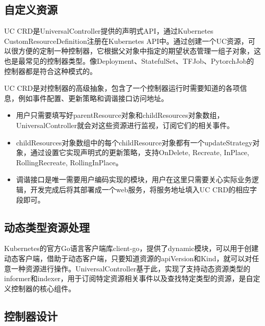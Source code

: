 \documentclass[macfonts,master]{njuthesis}
\begin{document}
\subsection{自定义资源}

UC CRD是UniversalController提供的声明式API，通过Kubernetes CustomResourceDefinition注册在Kubernetes API中。通过创建一个UC资源，可以很方便的定制一种控制器，它根据父对象中指定的期望状态管理一组子对象，这也是最常见的控制器类型。像Deployment、StatefulSet、TFJob、PytorchJob的控制器都是符合这种模式的。

UC CRD是对控制器的高级抽象，包含了一个控制器运行时需要知道的各项信息，例如事件配置、更新策略和调谐接口访问地址。

\begin{itemize}
	\item 用户只需要填写好parentResource对象和childResources对象数组，UniversalController就会对这些资源进行监视，订阅它们的相关事件。
	\item childResources对象数组中的每个childResource对象都有一个updateStrategy对象，通过设置它实现声明式的更新策略，支持OnDelete, Recreate, InPlace, RollingRecreate, RollingInPlace。
	\item 调谐接口是唯一需要用户编码实现的模块，用户在这里只需要关心实际业务逻辑，开发完成后将其部署成一个web服务，将服务地址填入UC CRD的相应字段即可。
\end{itemize}

\subsection{动态类型资源处理}
Kubernetes的官方Go语言客户端库client-go，提供了dynamic模块，可以用于创建动态客户端，借助于动态客户端，只要知道资源的apiVersion和Kind，就可以对任意一种资源进行操作。UniversalController基于此，实现了支持动态资源类型的informer和indexer，用于订阅特定资源相关事件以及查找特定类型的资源，是自定义控制器的核心组件。

\subsection{控制器设计}\label{controllerdesign}
\end{document}
